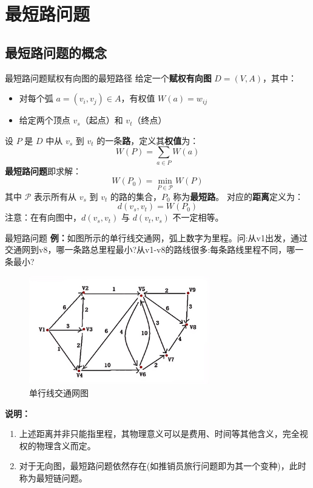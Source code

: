 	\section{最短路问题}
	\subsection{最短路问题的概念}
	\begin{dfnbox}{最短路问题}{赋权有向图的最短路径}
		给定一个\textbf{赋权有向图} \( D = (V, A) \)，其中：
		\begin{itemize}
			\item 对每个弧 \( a = (v_i, v_j) \in A \)，有权值 \( W(a) = w_{ij} \)
			\item 给定两个顶点 \( v_s \)（起点）和 \( v_t \)（终点）
		\end{itemize}
		设 \( P \) 是 \( D \) 中从 \( v_s \) 到 \( v_t \) 的一条\textbf{路}，定义其\textbf{权值}为：
		\[ W(P) = \sum_{a \in P} W(a) \]
		\textbf{最短路问题}即求解：
		\[ W(P_0) = \min_{P \in \mathcal{P}} W(P) \]
		其中 \( \mathcal{P} \) 表示所有从 \( v_s \) 到 \( v_t \) 的路的集合，\( P_0 \) 称为\textbf{最短路}。
		对应的\textbf{距离}定义为：
		\[ d(v_s, v_t) = W(P_0) \]
		注意：在有向图中，\( d(v_s, v_t) \) 与 \( d(v_t, v_s) \) 不一定相等。
	\end{dfnbox}
	\begin{exbox}{最短路问题}{}
		\textbf{例：}如图所示的单行线交通网，弧上数字为里程。问:从v1出发，通过交通网到v8，哪一条路总里程最小?从v1-v8的路线很多:每条路线里程不同，哪一条最小?
		\begin{figure}[H]
			\centering
			\includegraphics[width=0.7\textwidth]{./image/38.png}
			\caption{单行线交通网图}
			\label{fig:Chapter4_Temporary_Pavilion_1}
		\end{figure}
	\end{exbox}
	\textbf{说明：}
	\begin{enumerate}
		\item 上述距离并非只能指里程，其物理意义可以是费用、时间等其他含义，完全视权的物理含义而定。
		\item 对于无向图，最短路问题依然存在(如推销员旅行问题即为其一个变种)，此时称为最短链问题。
	\end{enumerate}

